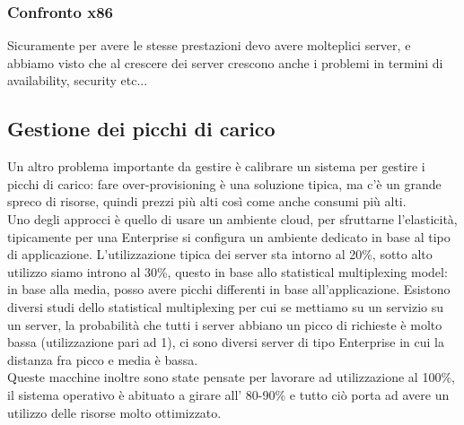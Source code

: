 \documentclass{article}
\begin{document}
\subsubsection{Confronto x86}
Sicuramente per avere le stesse prestazioni devo avere molteplici server, e abbiamo visto che al crescere dei server crescono anche i problemi in termini di availability, security etc...
\subsection{Gestione dei picchi di carico}
Un altro problema importante da gestire è calibrare un sistema per gestire i picchi di carico: fare over-provisioning è una soluzione tipica, ma c'è un grande spreco di risorse, quindi prezzi più alti così come anche consumi più alti.\\ Uno degli approcci è quello di usare un ambiente cloud, per sfruttarne l'elasticità, tipicamente per una Enterprise si configura un ambiente dedicato in base al tipo di applicazione. L'utilizzazione tipica dei server sta intorno al 20\%, sotto alto utilizzo siamo introno al 30\%, questo in base allo statistical multiplexing model: in base alla media, posso avere picchi differenti in base all'applicazione. Esistono diversi studi dello statistical multiplexing per cui se mettiamo su un servizio su un server, la probabilità che tutti i server abbiano un picco di richieste è molto bassa (utilizzazione pari ad 1), ci sono diversi server di tipo Enterprise in cui la distanza fra picco e media è bassa.\\ Queste macchine inoltre sono state pensate per lavorare ad utilizzazione al 100\%, il sistema operativo è abituato a girare all' 80-90\% e tutto ciò porta ad avere un utilizzo delle risorse molto ottimizzato.
\end{document}
